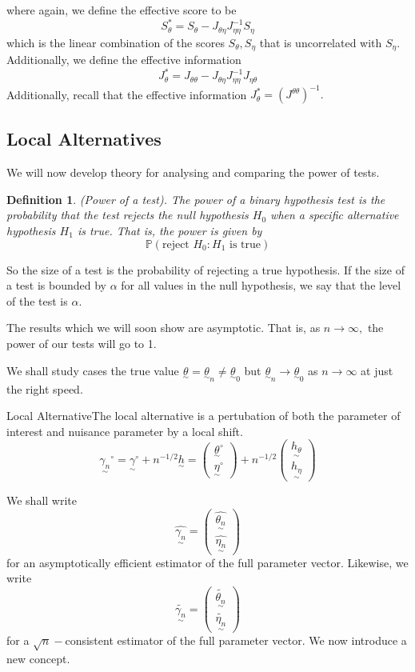 \documentclass[twoside]{article}
\newtheorem{definition}[theorem]{Definition}
\newcommand{\utilde}{\underset{\sim}}
\begin{document}
where again, we define the effective score to be
$$
S_{\theta}^{*} = S_{\theta} - J_{\theta \eta}J_{\eta \eta}^{-1}S_{\eta}
$$
which is the linear combination of the scores $S_{\theta}, S_{\eta}$ that is uncorrelated with $S_{\eta}.$ Additionally, we define the effective information 
$$
J_{\theta}^{*} = J_{\theta \theta} - J_{\theta \eta}J_{\eta \eta}^{-1}J_{\eta \theta}
$$
Additionally, recall that the effective information $J_{\theta}^{*} = (J^{\theta \theta})^{-1}.$
\subsection{Local Alternatives}
We will now develop theory for analysing and comparing the power of tests.

\begin{definition}(Power of a test). The power of a binary hypothesis test is the probability that the test rejects the null hypothesis $H_0$ when a specific alternative hypothesis $H_1$ is true. That is, the power is given by
$$
\mathbb{P}(\text{reject }H_0: H_1 \text{ is true})
$$
\end{definition}

So the size of a test is the probability of rejecting a true hypothesis. If the size of a test is bounded by $\alpha$ for all values in the null hypothesis, we say that the level of the test is $\alpha.$

The results which we will soon show are asymptotic. That is, as $n \rightarrow \infty,$ the power of our tests will go to 1.

We shall study cases the true value $\utilde{\theta} = \utilde{\theta}_n \neq \utilde{\theta}_0$ but $\utilde{\theta}_n \rightarrow \utilde{\theta}_0$ as $n \rightarrow \infty$ at just the right speed. 
\begin{definition_exam}{Local Alternative}{}The local alternative is a pertubation of both the parameter of interest and nuisance parameter by a local shift.
$$
\utilde{\gamma_n}^{\circ} = \utilde{\gamma}^{\circ} + n^{-1/2}\utilde{h} 
= \begin{pmatrix}\utilde{\theta}^{\circ}\\\utilde{\eta}^{\circ}\end{pmatrix} + n^{-1/2}\begin{pmatrix}\utilde{h_{\theta}}\\\utilde{h_{\eta}} \end{pmatrix}
$$
\end{definition_exam}

We shall write 
$$
\hat{\utilde{\gamma_n}} = 
\begin{pmatrix}
\hat{\utilde{\theta_n}}\\
\hat{\utilde{\eta_n}}
\end{pmatrix}
$$
for an asymptotically efficient estimator of the full parameter vector. Likewise, we write 
$$
\tilde{\utilde{\gamma_n}} = 
\begin{pmatrix}
\tilde{\utilde{\theta_n}}\\
\tilde{\utilde{\eta_n}}
\end{pmatrix}
$$
for a $\sqrt{n}-$consistent estimator of the full parameter vector. We now introduce a new concept.
\end{document}
